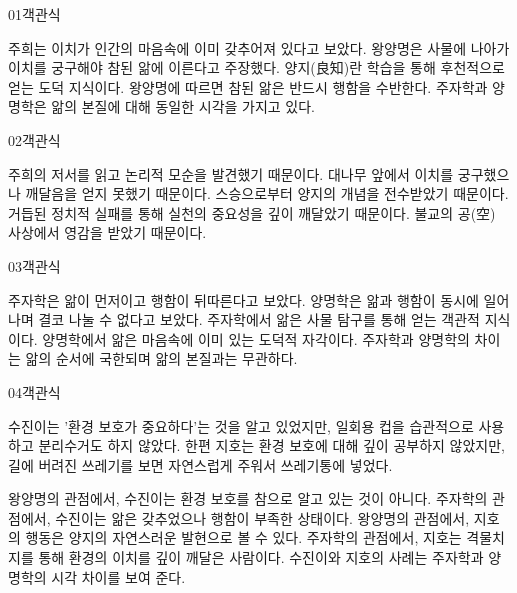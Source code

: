 \documentclass[fs85,seriesWit]{korfarm-base}
\begin{document}
\kfBeginMC
\begin{kfQBlock}{01}{객관식}
\begin{kfChoices}
\kfChoice 주희는 이치가 인간의 마음속에 이미 갖추어져 있다고 보았다.
\kfChoice 왕양명은 사물에 나아가 이치를 궁구해야 참된 앎에 이른다고 주장했다.
\kfChoice 양지(良知)란 학습을 통해 후천적으로 얻는 도덕 지식이다.
\kfChoice 왕양명에 따르면 참된 앎은 반드시 행함을 수반한다.
\kfChoice 주자학과 양명학은 앎의 본질에 대해 동일한 시각을 가지고 있다.
\end{kfChoices}
\end{kfQBlock}

\begin{kfQBlock}{02}{객관식}
\begin{kfChoices}
\kfChoice 주희의 저서를 읽고 논리적 모순을 발견했기 때문이다.
\kfChoice 대나무 앞에서 이치를 궁구했으나 깨달음을 얻지 못했기 때문이다.
\kfChoice 스승으로부터 양지의 개념을 전수받았기 때문이다.
\kfChoice 거듭된 정치적 실패를 통해 실천의 중요성을 깊이 깨달았기 때문이다.
\kfChoice 불교의 공(空) 사상에서 영감을 받았기 때문이다.
\end{kfChoices}
\end{kfQBlock}

\begin{kfQBlock}{03}{객관식}
\begin{kfChoices}
\kfChoice 주자학은 앎이 먼저이고 행함이 뒤따른다고 보았다.
\kfChoice 양명학은 앎과 행함이 동시에 일어나며 결코 나눌 수 없다고 보았다.
\kfChoice 주자학에서 앎은 사물 탐구를 통해 얻는 객관적 지식이다.
\kfChoice 양명학에서 앎은 마음속에 이미 있는 도덕적 자각이다.
\kfChoice 주자학과 양명학의 차이는 앎의 순서에 국한되며 앎의 본질과는 무관하다.
\end{kfChoices}
\end{kfQBlock}

\begin{kfQBlock}{04}{객관식}
\begin{kfEvidence}수진이는 '환경 보호가 중요하다'는 것을 알고 있었지만, 일회용 컵을 습관적으로 사용하고 분리수거도 하지 않았다. 한편 지호는 환경 보호에 대해 깊이 공부하지 않았지만, 길에 버려진 쓰레기를 보면 자연스럽게 주워서 쓰레기통에 넣었다.\end{kfEvidence}
\begin{kfChoices}
\kfChoice 왕양명의 관점에서, 수진이는 환경 보호를 참으로 알고 있는 것이 아니다.
\kfChoice 주자학의 관점에서, 수진이는 앎은 갖추었으나 행함이 부족한 상태이다.
\kfChoice 왕양명의 관점에서, 지호의 행동은 양지의 자연스러운 발현으로 볼 수 있다.
\kfChoice 주자학의 관점에서, 지호는 격물치지를 통해 환경의 이치를 깊이 깨달은 사람이다.
\kfChoice 수진이와 지호의 사례는 주자학과 양명학의 시각 차이를 보여 준다.
\end{kfChoices}
\end{kfQBlock}
\end{document}
